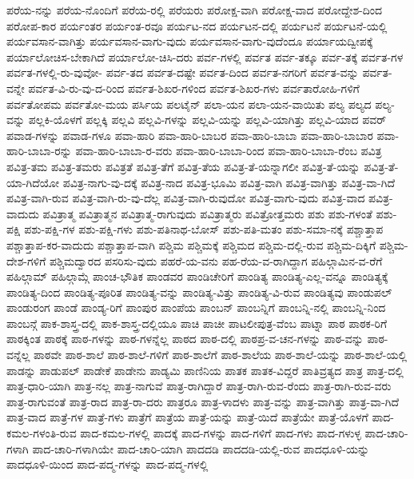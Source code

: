 {ಪರೆಯ-ನನ್ನು
ಪರೆಯ-ನೊಂದಿಗೆ
ಪರೆಯ-ರಲ್ಲಿ
ಪರೆಯರು
ಪರೋಕ್ಷ-ವಾಗಿ
ಪರೋಕ್ಷ-ವಾದ
ಪರೋದ್ದೇಶ-ದಿಂದ
ಪರೋಪ-ಕಾರ
ಪರ್ಯಂತರ
ಪರ್ಯಂತ-ರವೂ
ಪರ್ಯಟ-ನದ
ಪರ್ಯಟನ-ದಲ್ಲಿ
ಪರ್ಯಟನೆ
ಪರ್ಯಟನೆ-ಯಲ್ಲಿ
ಪರ್ಯವಸಾನ-ವಾಗಿತ್ತು
ಪರ್ಯವಸಾನ-ವಾಗು-ವುದು
ಪರ್ಯವಸಾನ-ವಾಗು-ವುದೆಂದೂ
ಪರ್ಯಾಯದ್ವೀಪಕ್ಕೆ
ಪರ್ಯಾಲೋಚಿಸ-ಬೇಕಾಗಿದೆ
ಪರ್ಯಾಲೋ-ಚಿಸಿ-ದರು
ಪರ್ವ-ಗಳಲ್ಲಿ
ಪರ್ವತ
ಪರ್ವ-ತಕ್ಕೂ
ಪರ್ವ-ತಕ್ಕೆ
ಪರ್ವತ-ಗಳ
ಪರ್ವತ-ಗಳಲ್ಲಿ-ರು-ವುವೋ-
ಪರ್ವ-ತದ
ಪರ್ವತ-ದಷ್ಟೇ
ಪರ್ವತ-ದಿಂದ
ಪರ್ವತ-ನಗರಿಗೆ
ಪರ್ವತ-ವನ್ನು
ಪರ್ವತ-ವನ್ನೇ
ಪರ್ವತ-ವಿ-ರು-ವು-ದ-ರಿಂದ
ಪರ್ವತ-ಶಿಖರ-ಗಳಿಂದ
ಪರ್ವತ-ಶಿಖರ-ಗಳು
ಪರ್ವತಾರೋಹಿ-ಗಳಿಗೆ
ಪರ್ವತೋಪಮ
ಪರ್ವತೋ-ಮಯ
ಪರ್ಸಿಯ
ಪಲಟೈನ್
ಪಲಾ-ಯನ
ಪಲಾ-ಯನ-ವಾಯಿತು
ಪಲ್ಯ
ಪಲ್ಯದ
ಪಲ್ಯ-ವನ್ನು
ಪಲ್ಲಕಿ-ಯೊಳಗೆ
ಪಲ್ಲಕ್ಕಿ
ಪಲ್ಲವಿ
ಪಲ್ಲವಿ-ಗಳನ್ನು
ಪಲ್ಲವಿ-ಯನ್ನು
ಪಲ್ಲವಿ-ಯಾಗಿತ್ತು
ಪಲ್ಲವಿ-ಯಾದ
ಪವರ್
ಪವಾಡ-ಗಳನ್ನು
ಪವಾಡ-ಗಳೂ
ಪವಾ-ಹಾರಿ
ಪವಾ-ಹಾರಿ-ಬಾಬರ
ಪವಾ-ಹಾರಿ-ಬಾಬಾ
ಪವಾ-ಹಾರಿ-ಬಾಬಾರ
ಪವಾ-ಹಾರಿ-ಬಾಬಾ-ರನ್ನು
ಪವಾ-ಹಾರಿ-ಬಾಬಾ-ರ-ವರು
ಪವಾ-ಹಾರಿ-ಬಾಬಾ-ರಿಂದ
ಪವಾ-ಹಾರಿ-ಬಾಬಾ-ರೆಂಬ
ಪವಿತ್ರ
ಪವಿತ್ರ-ತಮ
ಪವಿತ್ರ-ತಮರು
ಪವಿತ್ರತೆ
ಪವಿತ್ರ-ತೆಗೆ
ಪವಿತ್ರ-ತೆಯ
ಪವಿತ್ರ-ತೆ-ಯನ್ನಾಗಲೀ
ಪವಿತ್ರ-ತೆ-ಯನ್ನು
ಪವಿತ್ರ-ತೆ-ಯಾ-ಗಿದೆಯೋ
ಪವಿತ್ರ-ನಾಗು-ವು-ದಕ್ಕೆ
ಪವಿತ್ರ-ನಾದ
ಪವಿತ್ರ-ಭೂಮಿ
ಪವಿತ್ರ-ವಾಗಿ
ಪವಿತ್ರ-ವಾಗಿತ್ತು
ಪವಿತ್ರ-ವಾ-ಗಿದೆ
ಪವಿತ್ರ-ವಾಗಿ-ರುವ
ಪವಿತ್ರ-ವಾಗಿ-ರು-ವು-ದೆಲ್ಲ
ಪವಿತ್ರ-ವಾಗಿ-ರುವುದೋ
ಪವಿತ್ರ-ವಾಗು-ವುದು
ಪವಿತ್ರ-ವಾದ
ಪವಿತ್ರ-ವಾದುದು
ಪವಿತ್ರಾತ್ಮ
ಪವಿತ್ರಾತ್ಮನ
ಪವಿತ್ರಾತ್ಮ-ರಾಗುವುದು
ಪವಿತ್ರಾತ್ಮರು
ಪವಿತ್ರೋತ್ತಮರು
ಪಶು
ಪಶು-ಗಳಂತೆ
ಪಶು-ಪಕ್ಷಿ
ಪಶು-ಪಕ್ಷಿ-ಗಳ
ಪಶು-ಪಕ್ಷಿ-ಗಳು
ಪಶು-ಪತಿನಾಥ-ಬೋಸ್
ಪಶು-ಪತಿ-ಮತಂ
ಪಶು-ಸಮಾ-ನಕ್ಕೆ
ಪಶ್ಚಾತ್ತಾಪ
ಪಶ್ಚಾತ್ತಾಪ-ಕರ-ವಾದುದು
ಪಶ್ಚಾತ್ತಾಪ-ವಾಗಿ
ಪಶ್ಚಿಮ
ಪಶ್ಚಿಮಕ್ಕೆ
ಪಶ್ಚಿಮದ
ಪಶ್ಚಿಮ-ದಲ್ಲಿ-ರುವ
ಪಶ್ಚಿಮ-ದಿಕ್ಕಿಗೆ
ಪಶ್ಚಿಮ-ದೇಶ-ಗಳಿಗೆ
ಪಶ್ಚಿಮದ್ವಾರದ
ಪಸರಿಸು-ವುದು
ಪಹರೆ-ಯ-ವನು
ಪಹ-ರೆಯ-ವ-ರಾಗಿದ್ದಾಗ
ಪಹಿಲ್ಗಾಮಿನ-ವ-ರೆಗೆ
ಪಹಿಲ್ಗಾಮ್
ಪಹಿಲ್ಗಾಮ್ಗೆ
ಪಾಂಚ-ಭೌತಿಕ
ಪಾಂಡವರ
ಪಾಂಡಿಚೇರಿಗೆ
ಪಾಂಡಿತ್ಯ
ಪಾಂಡಿತ್ಯ-ಎಲ್ಲ-ವನ್ನೂ
ಪಾಂಡಿತ್ಯಕ್ಕೆ
ಪಾಂಡಿತ್ಯ-ದಿಂದ
ಪಾಂಡಿತ್ಯ-ಪೂರಿತ
ಪಾಂಡಿತ್ಯ-ವನ್ನು
ಪಾಂಡಿತ್ಯ-ವಿತ್ತು
ಪಾಂಡಿತ್ಯ-ವಿ-ರುವ
ಪಾಂಡಿತ್ಯವು
ಪಾಂಡುಪಲ್
ಪಾಂಡುರಂಗ
ಪಾಂಡೆ
ಪಾಂಡ್ಯ-ರಿಗೆ
ಪಾಂಪುರ
ಪಾಂಪೆಯ
ಪಾಂಬನ್
ಪಾಂಬನ್ನಿಗೆ
ಪಾಂಬನ್ನಿ-ನಲ್ಲಿ
ಪಾಂಬನ್ನಿ-ನಿಂದ
ಪಾಂಬನ್ಗೆ
ಪಾಕ-ಶಾಸ್ತ್ರ-ದಲ್ಲಿ
ಪಾಕ-ಶಾಸ್ತ್ರ-ದಲ್ಲಿಯೂ
ಪಾಚಿ
ಪಾಚೀ
ಪಾಟಲೀಪುತ್ರ-ವೆಂಬ
ಪಾಟ್ನಾ
ಪಾಠ
ಪಾಠಕ-ರಿಗೆ
ಪಾಠಕ್ಕಿಂತ
ಪಾಠಕ್ಕೆ
ಪಾಠ-ಗಳನ್ನು
ಪಾಠ-ಗಳನ್ನೆಲ್ಲ
ಪಾಠದ
ಪಾಠ-ದಲ್ಲಿ
ಪಾಠಪ್ರ-ವ-ಚನ-ಗಳನ್ನು
ಪಾಠ-ವನ್ನು
ಪಾಠ-ವನ್ನೆಲ್ಲ
ಪಾಠವೇ
ಪಾಠ-ಶಾಲೆ
ಪಾಠ-ಶಾಲೆ-ಗಳಿಗೆ
ಪಾಠ-ಶಾಲೆಗೆ
ಪಾಠ-ಶಾಲೆಯ
ಪಾಠ-ಶಾಲೆ-ಯನ್ನು
ಪಾಠ-ಶಾಲೆ-ಯಲ್ಲಿ
ಪಾಡನ್ನು
ಪಾಡುಪಲ್
ಪಾಡೇಕೆ
ಪಾಡೇನು
ಪಾಡ್ಯಮಿ
ಪಾಣಿನಿಯ
ಪಾತಕ
ಪಾತಕ-ವಿದ್ದರೆ
ಪಾತಿವ್ರತ್ಯದ
ಪಾತ್ರ
ಪಾತ್ರ-ದಲ್ಲಿ
ಪಾತ್ರ-ಧಾರಿ-ಯಾಗಿ
ಪಾತ್ರ-ನಲ್ಲ
ಪಾತ್ರ-ನಾಗುವೆ
ಪಾತ್ರ-ರಾಗಿದ್ದಾರೆ
ಪಾತ್ರ-ರಾಗಿ-ರುವ-ರೆಂದು
ಪಾತ್ರ-ರಾಗಿ-ರುವ-ವರು
ಪಾತ್ರ-ರಾಗುವಂತೆ
ಪಾತ್ರ-ರಾದ
ಪಾತ್ರ-ರಾ-ದರು
ಪಾತ್ರರೂ
ಪಾತ್ರ-ಳಾದಳು
ಪಾತ್ರ-ವನ್ನು
ಪಾತ್ರ-ವಾಗಿತ್ತು
ಪಾತ್ರ-ವಾ-ಗಿದೆ
ಪಾತ್ರ-ವಾದ
ಪಾತ್ರೆ-ಗಳ
ಪಾತ್ರೆ-ಗಳು
ಪಾತ್ರೆಗೆ
ಪಾತ್ರೆಯ
ಪಾತ್ರೆ-ಯನ್ನು
ಪಾತ್ರೆ-ಯಿದೆ
ಪಾತ್ರೆಯೇ
ಪಾತ್ರೆ-ಯೊಳಗೆ
ಪಾದ-ಕಮಲ-ಗಳಂತಿ-ರುವ
ಪಾದ-ಕಮಲ-ಗಳಲ್ಲಿ
ಪಾದಕ್ಕೆ
ಪಾದ-ಗಳನ್ನು
ಪಾದ-ಗಳಿಗೆ
ಪಾದ-ಗಳು
ಪಾದ-ಗಳುಳ್ಳ
ಪಾದ-ಚಾರಿ-ಗಳಾಗಿ
ಪಾದ-ಚಾರಿ-ಗಳಾಗಿಯೇ
ಪಾದ-ಚಾರಿ-ಯಾಗಿ
ಪಾದದಡಿ
ಪಾದದಡಿ-ಯಲ್ಲಿ-ರುವ
ಪಾದಧೂಳಿ-ಯನ್ನು
ಪಾದಧೂಳಿ-ಯಿಂದ
ಪಾದ-ಪದ್ಮ-ಗಳನ್ನು
ಪಾದ-ಪದ್ಮ-ಗಳಲ್ಲಿ
}

